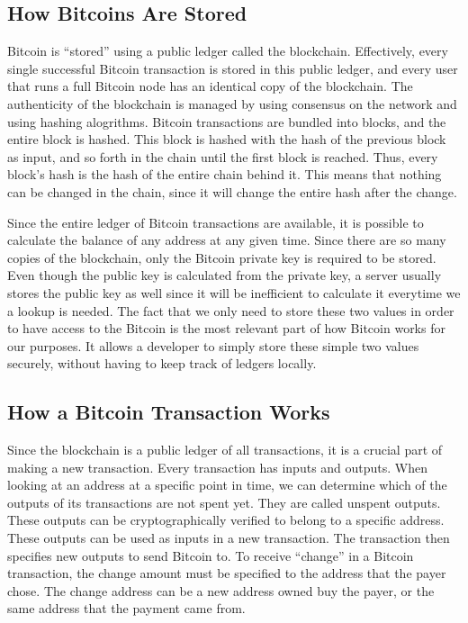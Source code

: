 \subsection{How Bitcoins Are Stored}
\label{sbs:bitcoin_stored}

Bitcoin is ``stored'' using a public ledger called the blockchain. Effectively, every single successful Bitcoin transaction is stored in this public ledger, and every user that runs a full Bitcoin node has an identical copy of the blockchain. The authenticity of the blockchain is managed by using consensus on the network and using hashing alogrithms. Bitcoin transactions are bundled into blocks, and the entire block is hashed. This block is hashed with the hash of the previous block as input, and so forth in the chain until the first block is reached. Thus, every block's hash is the hash of the entire chain behind it. This means that nothing can be changed in the chain, since it will change the entire hash after the change.

Since the entire ledger of Bitcoin transactions are available, it is possible to calculate the balance of any address at any given time. Since there are so many copies of the blockchain, only the Bitcoin private key is required to be stored. Even though the public key is calculated from the private key, a server usually stores the public key as well since it will be inefficient to calculate it everytime we a lookup is needed. The fact that we only need to store these two values in order to have access to the Bitcoin is the most relevant part of how Bitcoin works for our purposes. It allows a developer to simply store these simple two values securely, without having to keep track of ledgers locally.

\subsection{How a Bitcoin Transaction Works}

Since the blockchain is a public ledger of all transactions, it is a crucial part of making a new transaction. Every transaction has inputs and outputs. When looking at an address at a specific point in time, we can determine which of the outputs of its transactions are not spent yet. They are called unspent outputs. These outputs can be cryptographically verified to belong to a specific address. These outputs can be used as inputs in a new transaction. The transaction then specifies new outputs to send Bitcoin to. To receive ``change'' in a Bitcoin transaction, the change amount must be specified to the address that the payer chose. The change address can be a new address owned buy the payer, or the same address that the payment came from.

